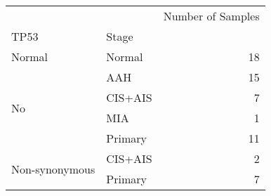 \begin{tabular}{l|lr}
\toprule
               &         & Number of Samples \\
TP53 & Stage &                   \\
\midrule
Normal & Normal &                18 \\
\multirow{4}{*}{No} & AAH &                15 \\
               & CIS+AIS &                 7 \\
               & MIA &                 1 \\
               & Primary &                11 \\
\cline{1-3}
\multirow{2}{*}{Non-synonymous} & CIS+AIS &                 2 \\
               & Primary &                 7 \\
\bottomrule
\end{tabular}
